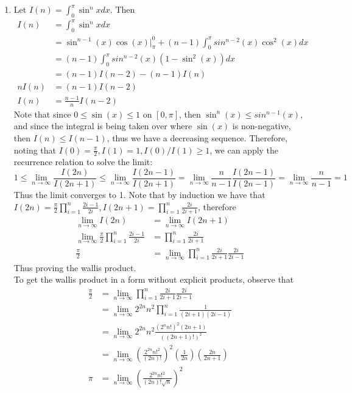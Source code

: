 \documentclass[12pt, letterpaper]{article}
\begin{document}
\begin{enumerate}
	\item Let $I(n) = \int_0^\pi \sin^n x dx.$  Then 
	\begin{align*}
		I(n) &= \int_0^\pi \sin^n x dx\\
		&= \sin^{n-1}(x) \cos(x)|^0_\pi + (n-1)\int_0^\pi sin^{n-2}(x)\cos^2(x)dx\\
		&= (n-1) \int_0^\pi sin^{n-2}(x)(1-\sin^2(x))dx\\
		&= (n-1)I(n-2)-(n-1)I(n)\\
		nI(n) &= (n-1)I(n-2)\\
		I(n) &= \frac{n-1}{n} I(n-2)
	\end{align*}
	Note that since $0 \leq \sin(x) \leq 1$ on $[0,\pi]$, then $\sin^n (x) \leq sin^{n-1} (x)$, and since the integral
	is being taken over where $\sin(x)$ is non-negative, then $I(n) \leq I(n-1)$, thus we have a decreasing sequence.  
	Therefore, noting that $I(0) = \frac{\pi}{2}, I(1) = 1, I(0)/I(1) \geq 1$, we can apply the recurrence relation to solve the limit:
	$$
	1 \leq \lim_{n \to \infty} \frac{I(2n)}{I(2n+1)} \leq \lim_{n \to \infty} \frac{I(2n-1)}{I(2n+1)} = \lim_{n \to \infty} \frac{n}{n-1} \frac{I(2n-1)}{I(2n-1)} =  \lim_{n \to \infty} \frac{n}{n-1} = 1
	$$
	Thus the limit converges to 1.  
	Note that by induction we have that $I(2n) = \frac{\pi}{2} \prod_{i=1}^n \frac{2i-1}{2i}, I(2n+1) =  \prod_{i=1}^n \frac{2i}{2i+1}$, therefore 
	\begin{align*}
		\lim_{n \to \infty} I(2n) &= \lim_{n \to \infty} I(2n+1)\\
		\lim_{n \to \infty} \frac{\pi}{2} \prod_{i=1}^n \frac{2i-1}{2i} &= \prod_{i=1}^n \frac{2i}{2i+1}\\
		\frac{\pi}{2} &= \lim_{n \to \infty} \prod_{i=1}^n \frac{2i}{2i+1} \frac{2i}{2i-1}
	\end{align*}
	Thus proving the wallis product.\\
	To get the wallis product in a form without explicit products, observe that 
	\begin{align*}
		\frac{\pi}{2} &= \lim_{n \to \infty} \prod_{i=1}^n \frac{2i}{2i+1} \frac{2i}{2i-1}\\
		&= \lim_{n \to \infty} 2^{2n}n^2 \prod_{i=1}^n \frac{1}{(2i+1)(2i-1)}\\
		&= \lim_{n \to \infty} 2^{2n}n^2 \frac{(2^n n!)^2 (2n+1)}{((2n+1)!)^2}\\
		&= \lim_{n \to \infty} \left(\frac{2^{2n}n!^2}{(2n)!}\right)^2 \left(\frac{1}{2n}\right)\left(\frac{2n}{2n+1}\right)\\
		\pi &= \lim_{n \to \infty} \left(\frac{2^{2n}n!^2}{(2n)!\sqrt{n}}\right)^2

\end{align*}
\end{enumerate}
\end{document}
